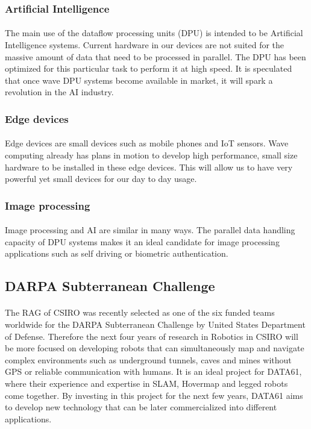 \subsubsection*{Artificial Intelligence}
\paragraph{}
The main use of the dataflow processing units (DPU) is intended to be Artificial Intelligence systems. Current hardware in our devices are not suited for the massive amount of data that need to be processed in parallel. The DPU has been optimized for this particular task to perform it at high speed. It is speculated that once wave DPU systems become available in market, it will spark a revolution in the AI industry.

\subsubsection*{Edge devices}
\paragraph{}
Edge devices are small devices such as mobile phones and IoT sensors. Wave computing already has plans in motion to develop high performance, small size hardware to be installed in these edge devices. This will allow us to have very powerful yet small devices for our day to day usage.

\subsubsection*{Image processing}
\paragraph{}
Image processing and AI are similar in many ways. The parallel data handling capacity of DPU systems makes it an ideal candidate for image processing applications such as self driving or biometric authentication.


\subsection{DARPA Subterranean Challenge}
\label{ssec:darpa}
\paragraph{}
The RAG of CSIRO was recently selected as one of the six funded teams worldwide for the DARPA Subterranean Challenge \cite{darpa} by United States Department of Defense. Therefore the next four years of research in Robotics in CSIRO will be more focused on developing robots that can simultaneously map and navigate complex environments such as underground tunnels, caves and mines without GPS or reliable communication with humans. It is an ideal project for DATA61, where their experience and expertise in SLAM, Hovermap and legged robots come together. By investing in this project for the next few years, DATA61 aims to develop new technology that can be later commercialized into different applications. 


